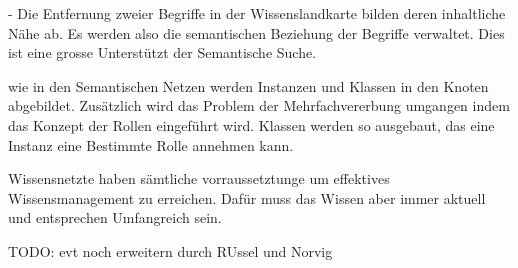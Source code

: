 - Die Entfernung zweier Begriffe in der Wissenslandkarte bilden deren inhaltliche Nähe ab. Es werden also die semantischen Beziehung der Begriffe verwaltet. Dies ist eine grosse Unterstützt der Semantische Suche.

wie in den Semantischen Netzen werden Instanzen und Klassen in den Knoten abgebildet. Zusätzlich wird das Problem der Mehrfachvererbung umgangen indem das Konzept der Rollen eingeführt wird. Klassen werden so ausgebaut, das eine Instanz eine Bestimmte Rolle annehmen kann.
	
Wissensnetzte haben sämtliche vorraussetztunge um effektives Wissensmanagement zu erreichen. Dafür muss das Wissen aber immer aktuell und entsprechen Umfangreich sein.


TODO: evt noch erweitern durch RUssel und Norvig

